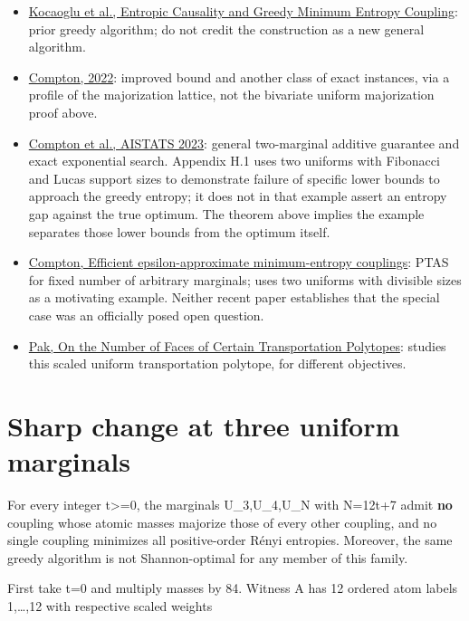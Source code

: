\documentclass[11pt]{article}
\newcommand{\tightlist}{\setlength{\itemsep}{2pt}\setlength{\parskip}{0pt}}
\begin{document}
\begin{itemize}
\tightlist
\item
  \href{https://arxiv.org/abs/1701.08254}{Kocaoglu et al., Entropic Causality and Greedy Minimum Entropy Coupling}: prior greedy algorithm; do not credit the construction as a new general algorithm.
\item
  \href{https://arxiv.org/abs/2203.05108}{Compton, 2022}: improved bound and another class of exact instances, via a profile of the majorization lattice, not the bivariate uniform majorization proof above.
\item
  \href{https://proceedings.mlr.press/v206/compton23a.html}{Compton et al., AISTATS 2023}: general two-marginal additive guarantee and exact exponential search. Appendix H.1 uses two uniforms with Fibonacci and Lucas support sizes to demonstrate failure of specific lower bounds to approach the greedy entropy; it does not in that example assert an entropy gap against the true optimum. The theorem above implies the example separates those lower bounds from the optimum itself.
\item
  \href{https://arxiv.org/html/2509.19598}{Compton, Efficient epsilon-approximate minimum-entropy couplings}: PTAS for fixed number of arbitrary marginals; uses two uniforms with divisible sizes as a motivating example. Neither recent paper establishes that the special case was an officially posed open question.
\item
  \href{https://www.math.ucla.edu/~pak/papers/pol.pdf}{Pak, On the Number of Faces of Certain Transportation Polytopes}: studies this scaled uniform transportation polytope, for different objectives.
\end{itemize}

\section{Sharp change at three uniform marginals}\label{sharp-change-at-three-uniform-marginals}

For every integer t\textgreater=0, the marginals U\_3,U\_4,U\_N with N=12t+7 admit \textbf{no} coupling whose atomic masses majorize those of every other coupling, and no single coupling minimizes all positive-order Rényi entropies. Moreover, the same greedy algorithm is not Shannon-optimal for any member of this family.

First take t=0 and multiply masses by 84. Witness A has 12 ordered atom labels 1,\ldots,12 with respective scaled weights
\end{document}
